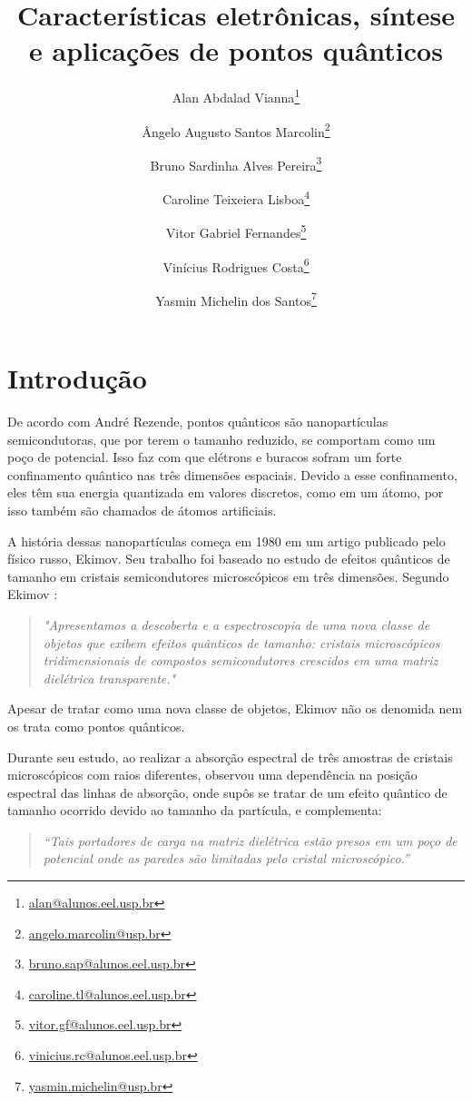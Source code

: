 \documentclass[11pt]{article}
\title{Características eletrônicas, síntese e aplicações de pontos quânticos}
\author[1]{Alan Abdalad Vianna\footnote{\href{mailto:alan@alunos.eel.usp.br}{alan@alunos.eel.usp.br}}}
\author[1]{Ângelo Augusto Santos Marcolin\footnote{\href{mailto:angelo.marcolin@usp.br}{angelo.marcolin@usp.br}} }
\author[1]{Bruno Sardinha Alves Pereira\footnote{\href{mailto:bruno.sap@alunos.eel.usp.br}{bruno.sap@alunos.eel.usp.br}} }
\author[1]{Caroline Teixeiera Lisboa\footnote{\href{mailto:caroline.tl@alunos.eel.usp.br}{caroline.tl@alunos.eel.usp.br}} }
\author[1]{Vitor Gabriel Fernandes\footnote{\href{mailto:vitor.gf@alunos.eel.usp.br}{vitor.gf@alunos.eel.usp.br}} }
\author[1]{Vinícius Rodrigues Costa\footnote{\href{mailto:vinicius.rc@alunos.eel.usp.br}{vinicius.rc@alunos.eel.usp.br}} }
\author[1]{Yasmin Michelin dos Santos\footnote{\href{mailto:yasmin.michelin@usp.br}{yasmin.michelin@usp.br}} }
\affil[1]{Escola de Engenharia de Lorena\\
Universidade de São Paulo\\
12602-810, Lorena, SP, Brasil}
\numberwithin{equation}{section}
\begin{document}
\onehalfspacing

\maketitle


\tableofcontents

\section{Introdução}


\par De acordo com André Rezende\cite{introducao1}, pontos quânticos são nanopartículas semicondutoras, que por terem o tamanho reduzido, se comportam como um poço de potencial. Isso faz com que elétrons e buracos sofram um forte confinamento quântico nas três dimensões espaciais. Devido a esse confinamento, eles têm sua energia quantizada em valores discretos, como em um átomo, por isso também são chamados de átomos artificiais.

\par A história dessas nanopartículas começa em 1980 em um artigo publicado pelo físico russo, Ekimov. Seu trabalho foi baseado no estudo de efeitos quânticos de tamanho em cristais semicondutores microscópicos em três dimensões. Segundo Ekimov \cite{introducao2}:

\begin{quote}
\textit{"Apresentamos a descoberta e a espectroscopia de uma nova classe de objetos que exibem efeitos quânticos de tamanho: cristais microscópicos tridimensionais de compostos semicondutores crescidos em uma matriz dielétrica transparente."}
\end{quote}

\par Apesar de tratar como uma nova classe de objetos, Ekimov não os denomida nem os trata como pontos quânticos.

\par Durante seu estudo, ao realizar a absorção espectral de três amostras de cristais microscópicos com raios diferentes, observou uma dependência na posição espectral das linhas de absorção, onde supôs se tratar de um efeito quântico de tamanho ocorrido devido ao tamanho da partícula, e complementa:

\begin{quote}
\textit{“Tais portadores de carga na matriz dielétrica estão presos em um poço de potencial onde as paredes são limitadas pelo cristal microscópico.”}
\end{quote}
\end{document}
